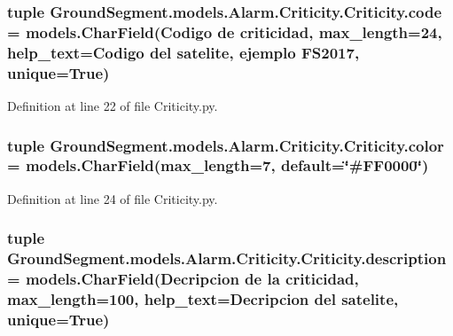 \subsubsection[{code}]{\setlength{\rightskip}{0pt plus 5cm}tuple Ground\+Segment.\+models.\+Alarm.\+Criticity.\+Criticity.\+code = models.\+Char\+Field(\textquotesingle{}Codigo de criticidad\textquotesingle{}, max\+\_\+length=24, help\+\_\+text=\textquotesingle{}Codigo del satelite, ejemplo F\+S2017\textquotesingle{}, unique=True)\hspace{0.3cm}{\ttfamily [static]}}\label{class_ground_segment_1_1models_1_1_alarm_1_1_criticity_1_1_criticity_a40e1efee5388c763ea32538c5fbc2077}


Definition at line 22 of file Criticity.\+py.

\hypertarget{class_ground_segment_1_1models_1_1_alarm_1_1_criticity_1_1_criticity_a6421ed3051ec960dd0ed52e4dd9cd88e}{}
\subsubsection[{color}]{\setlength{\rightskip}{0pt plus 5cm}tuple Ground\+Segment.\+models.\+Alarm.\+Criticity.\+Criticity.\+color = models.\+Char\+Field(max\+\_\+length=7, default=\char`\"{}\#F\+F0000\char`\"{})\hspace{0.3cm}{\ttfamily [static]}}\label{class_ground_segment_1_1models_1_1_alarm_1_1_criticity_1_1_criticity_a6421ed3051ec960dd0ed52e4dd9cd88e}


Definition at line 24 of file Criticity.\+py.

\hypertarget{class_ground_segment_1_1models_1_1_alarm_1_1_criticity_1_1_criticity_ae4c538dfc524b4715722c42d6bf23f06}{}
\subsubsection[{description}]{\setlength{\rightskip}{0pt plus 5cm}tuple Ground\+Segment.\+models.\+Alarm.\+Criticity.\+Criticity.\+description = models.\+Char\+Field(\textquotesingle{}Decripcion de la criticidad\textquotesingle{}, max\+\_\+length=100, help\+\_\+text=\textquotesingle{}Decripcion del satelite\textquotesingle{}, unique=True)\hspace{0.3cm}{\ttfamily [static]}}\label{class_ground_segment_1_1models_1_1_alarm_1_1_criticity_1_1_criticity_ae4c538dfc524b4715722c42d6bf23f06}


